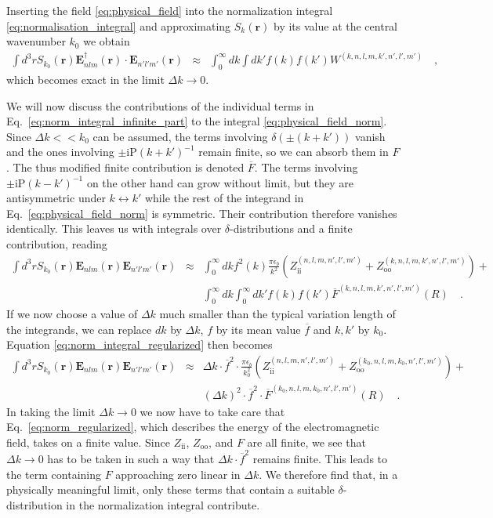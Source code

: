 \documentclass[10pt,letterpaper]{article}
\newcommand{\ii}{\text{i}}
\renewcommand{\vec}[1]{\mathbf{#1}}
\begin{document}
Inserting the field \eqref{eq:physical_field} into the normalization integral \eqref{eq:normalisation_integral} and approximating $S_{k}(\vec{r})$ by its value at the central wavenumber $k_0$ we obtain
\begin{eqnarray}
\int d^3r S_{k_0}(\vec{r})\vec{E}_{nlm}^\dagger(\vec{r})\cdot\vec{E}_{n'l'm'}(\vec{r}) &\approx& \int_0^\infty dk \int dk' f(k) f(k')  W^{(k,n,l,m,k',n',l',m')} \quad ,\label{eq:physical_field_norm}
\end{eqnarray}
which becomes exact in the limit $\Delta k \rightarrow 0$.

We will now discuss the contributions of the individual terms in Eq.~\eqref{eq:norm_integral_infinite_part} to the integral \eqref{eq:physical_field_norm}. Since $\Delta k << k_0$ can be assumed, the terms involving $\delta(\pm(k+k'))$ vanish and the ones involving $\pm\ii\text{P}(k+k')^{-1}$ remain finite, so we can absorb them in $F$. The thus modified finite contribution is denoted $\overline{F}$. The terms involving $\pm\ii\text{P}(k-k')^{-1}$ on the other hand can grow without limit, but they are antisymmetric under $k \leftrightarrow k'$ while the rest of the integrand in Eq.~\eqref{eq:physical_field_norm} is symmetric. Their contribution therefore vanishes identically. This leaves us with integrals over $\delta$-distributions and a finite contribution, reading
\begin{eqnarray}
\int d^3r S_{k_0}(\vec{r})\vec{E}_{nlm}(\vec{r})\vec{E}_{n'l'm'}(\vec{r}) &\approx& \int_0^\infty dk f^2(k) \frac{\pi\epsilon_b}{k^2} \left(Z_{\text{ii}}^{(n,l,m,n',l',m')}+Z_{\text{oo}}^{(k,n,l,m,k',n',l',m')}\right) + \nonumber \\
& & \int_0^\infty dk \int_0^\infty dk' f(k) f(k') \overline{F}^{(k,n,l,m,k',n',l',m')}(R) \quad . \label{eq:norm_integral_regularized}
\end{eqnarray}
If we now choose a value of $\Delta k$ much smaller than the typical variation length of the integrands, we can replace $dk$ by $\Delta k$, $f$ by its mean value $\overline{f}$ and $k,k'$ by $k_0$. Equation \eqref{eq:norm_integral_regularized} then becomes
\begin{eqnarray}
\int d^3r S_{k_0}(\vec{r})\vec{E}_{nlm}(\vec{r})\vec{E}_{n'l'm'}(\vec{r}) &\approx& \Delta k \cdot \overline{f}^2 \cdot \frac{\pi\epsilon_b}{k_0^2} \left(Z_{\text{ii}}^{(n,l,m,n',l',m')}+Z_{\text{oo}}^{(k_0,n,l,m,k_0,n',l',m')}\right) + \nonumber \\
& & \left(\Delta k\right)^2 \cdot \overline{f}^2 \cdot \overline{F}^{(k_0,n,l,m,k_0,n',l',m')}(R) \quad . \label{eq:norm_regularized}
\end{eqnarray}
In taking the limit $\Delta k \rightarrow 0$ we now have to take care that Eq.~\eqref{eq:norm_regularized}, which describes the energy of the electromagnetic field, takes on a finite value. Since $Z_{\text{ii}}$, $Z_{\text{oo}}$, and $F$ are all finite, we see that $\Delta k \rightarrow 0$ has to be taken in such a way that $\Delta k \cdot \overline{f}^2$ remains finite. This leads to the term containing $F$ approaching zero linear in $\Delta k$. We therefore find that, in a physically meaningful limit, only these terms that contain a suitable $\delta$-distribution in the normalization integral contribute.
\end{document}

